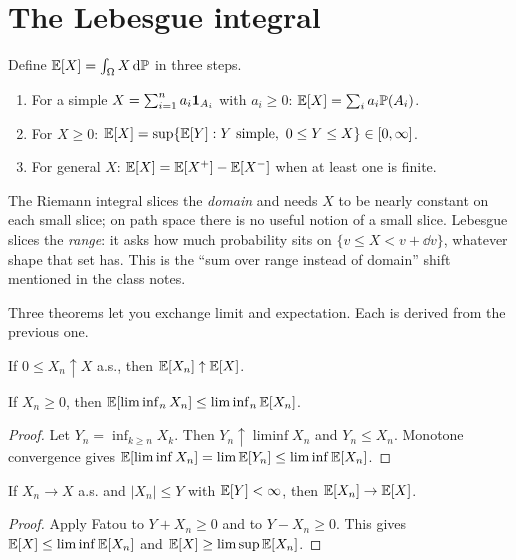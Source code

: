 \section{The Lebesgue integral}

Define $\mathbb{E}[X]=\int_\Omega X\,\mathrm{d}\mathbb{P}$ in three steps.
\begin{enumerate}
\item For a simple $X=\sum_{i=1}^n a_i\mathbf{1}_{A_i}$ with $a_i\ge 0$: $\mathbb{E}[X]=\sum_i a_i\mathbb{P}(A_i)$.
\item For $X\ge 0$: $\mathbb{E}[X]=\sup\{\mathbb{E}[Y]: Y\text{ simple},\ 0\le Y\le X\}\in[0,\infty]$.
\item For general $X$: $\mathbb{E}[X]=\mathbb{E}[X^+]-\mathbb{E}[X^-]$ when at least one is finite.
\end{enumerate}

\begin{intuition}
The Riemann integral slices the \emph{domain} and needs $X$ to be nearly constant on each small slice; on path space there is no useful notion of a small slice. Lebesgue slices the \emph{range}: it asks how much probability sits on $\{v\le X<v+\dd v\}$, whatever shape that set has. This is the ``sum over range instead of domain'' shift mentioned in the class notes.
\end{intuition}

Three theorems let you exchange limit and expectation. Each is derived from the previous one.

\begin{theorem}
If $0\le X_n\uparrow X$ a.s., then $\mathbb{E}[X_n]\uparrow\mathbb{E}[X]$.
\end{theorem}

\begin{theorem}\label{thm:fatou}
If $X_n\ge 0$, then $\mathbb{E}[\liminf_n X_n]\le\liminf_n\mathbb{E}[X_n]$.
\end{theorem}
\begin{proof}
Let $Y_n=\inf_{k\ge n}X_k$. Then $Y_n\uparrow\liminf X_n$ and $Y_n\le X_n$. Monotone convergence gives $\mathbb{E}[\liminf X_n]=\lim\mathbb{E}[Y_n]\le\liminf\mathbb{E}[X_n]$.
\end{proof}

\begin{theorem}\label{thm:dct}
If $X_n\to X$ a.s. and $|X_n|\le Y$ with $\mathbb{E}[Y]<\infty$, then $\mathbb{E}[X_n]\to\mathbb{E}[X]$.
\end{theorem}
\begin{proof}
Apply Fatou to $Y+X_n\ge 0$ and to $Y-X_n\ge 0$. This gives $\mathbb{E}[X]\le\liminf\mathbb{E}[X_n]$ and $\mathbb{E}[X]\ge\limsup\mathbb{E}[X_n]$.
\end{proof}

